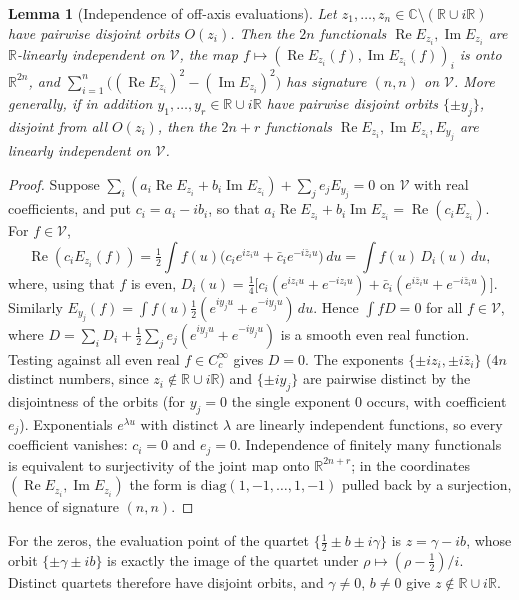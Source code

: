\documentclass[11pt]{amsart}
\newtheorem{lemma}[theorem]{Lemma}
\theoremstyle{definition}
\theoremstyle{remark}
\renewcommand{\Re}{\operatorname{Re}}
\renewcommand{\Im}{\operatorname{Im}}
\newcommand{\half}{\tfrac12}
\begin{document}
\begin{lemma}[Independence of off-axis evaluations]\label{lem:indep}
Let $z_1,\dots,z_n\in\mathbb C\setminus(\mathbb R\cup i\mathbb R)$ have pairwise disjoint orbits
$O(z_i)$. Then the $2n$ functionals $\Re E_{z_i},\Im E_{z_i}$ are $\mathbb R$-linearly independent
on $\mathcal V$, the map $f\mapsto(\Re E_{z_i}(f),\Im E_{z_i}(f))_i$ is onto $\mathbb R^{2n}$, and
$\sum_{i=1}^n\big((\Re E_{z_i})^2-(\Im E_{z_i})^2\big)$ has signature $(n,n)$ on $\mathcal V$.
More generally, if in addition $y_1,\dots,y_r\in\mathbb R\cup i\mathbb R$ have pairwise disjoint
orbits $\{\pm y_j\}$, disjoint from all $O(z_i)$, then the $2n+r$ functionals $\Re E_{z_i},\Im
E_{z_i},E_{y_j}$ are linearly independent on $\mathcal V$.
\end{lemma}
\begin{proof}
Suppose $\sum_i(a_i\Re E_{z_i}+b_i\Im E_{z_i})+\sum_j e_jE_{y_j}=0$ on $\mathcal V$ with real
coefficients, and put $c_i=a_i-ib_i$, so that $a_i\Re E_{z_i}+b_i\Im E_{z_i}=\Re(c_iE_{z_i})$.
For $f\in\mathcal V$,
\[
\Re(c_iE_{z_i}(f))=\tfrac12\int f(u)\big(c_ie^{iz_iu}+\bar c_ie^{-i\bar z_iu}\big)\,du
=\int f(u)\,D_i(u)\,du,
\]
where, using that $f$ is even, $D_i(u)=\frac14\big[c_i(e^{iz_iu}+e^{-iz_iu})+\bar
c_i(e^{i\bar z_iu}+e^{-i\bar z_iu})\big]$. Similarly $E_{y_j}(f)=\int f(u)\frac12(e^{iy_ju}+
e^{-iy_ju})\,du$. Hence $\int fD=0$ for all $f\in\mathcal V$, where
$D=\sum_iD_i+\frac12\sum_je_j(e^{iy_ju}+e^{-iy_ju})$ is a smooth even real function. Testing
against all even real $f\in C_c^\infty$ gives $D=0$. The exponents $\{\pm iz_i,\pm i\bar z_i\}$
($4n$ distinct numbers, since $z_i\notin\mathbb R\cup i\mathbb R$) and $\{\pm iy_j\}$ are pairwise
distinct by the disjointness of the orbits (for $y_j=0$ the single exponent $0$ occurs, with
coefficient $e_j$). Exponentials $e^{\lambda u}$ with distinct $\lambda$ are linearly independent
functions, so every coefficient vanishes: $c_i=0$ and $e_j=0$. Independence of finitely many
functionals is equivalent to surjectivity of the joint map onto $\mathbb R^{2n+r}$; in the
coordinates $(\Re E_{z_i},\Im E_{z_i})$ the form is $\mathrm{diag}(1,-1,\dots,1,-1)$ pulled back
by a surjection, hence of signature $(n,n)$.
\end{proof}

For the zeros, the evaluation point of the quartet $\{\half\pm b\pm i\gamma\}$ is
$z=\gamma-ib$, whose orbit $\{\pm\gamma\pm ib\}$ is exactly the image of the quartet under
$\rho\mapsto(\rho-\half)/i$. Distinct quartets therefore have disjoint orbits, and $\gamma\neq0$,
$b\neq0$ give $z\notin\mathbb R\cup i\mathbb R$.
\end{document}
